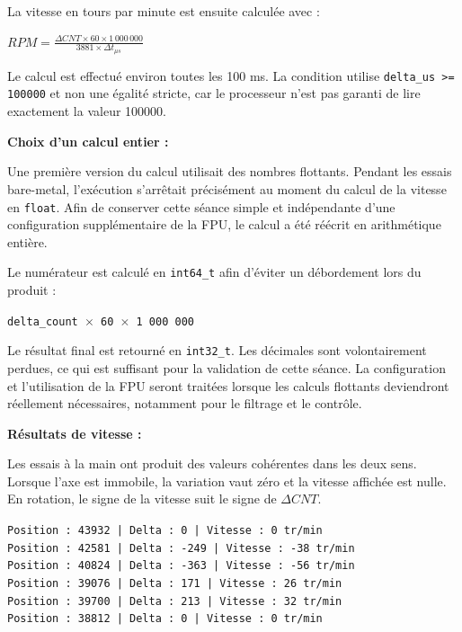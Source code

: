 \documentclass[11pt,a4paper]{article}
\begin{document}
\begin{sessionbox}
		La vitesse en tours par minute est ensuite calculée avec :
		
		\begin{center}
			$RPM = \frac{\Delta CNT \times 60 \times 1\,000\,000}{3881 \times \Delta t_{\mu s}}$
		\end{center}
		
		Le calcul est effectué environ toutes les 100 ms. La condition utilise \texttt{delta\_us >= 100000} et non une égalité stricte, car le processeur n'est pas garanti de lire exactement la valeur 100000.
		
		\vspace{0.3cm}
		
		\textbf{Choix d'un calcul entier :}
		
		Une première version du calcul utilisait des nombres flottants. Pendant les essais bare-metal, l'exécution s'arrêtait précisément au moment du calcul de la vitesse en \texttt{float}. Afin de conserver cette séance simple et indépendante d'une configuration supplémentaire de la FPU, le calcul a été réécrit en arithmétique entière.
		
		Le numérateur est calculé en \texttt{int64\_t} afin d'éviter un débordement lors du produit :
		
		\begin{center}
			\texttt{delta\_count $\times$ 60 $\times$ 1 000 000}
		\end{center}
		
		Le résultat final est retourné en \texttt{int32\_t}. Les décimales sont volontairement perdues, ce qui est suffisant pour la validation de cette séance. La configuration et l'utilisation de la FPU seront traitées lorsque les calculs flottants deviendront réellement nécessaires, notamment pour le filtrage et le contrôle.
		
		\vspace{0.3cm}
		
		\textbf{Résultats de vitesse :}
		
		Les essais à la main ont produit des valeurs cohérentes dans les deux sens. Lorsque l'axe est immobile, la variation vaut zéro et la vitesse affichée est nulle. En rotation, le signe de la vitesse suit le signe de $\Delta CNT$.
		
		\begin{center}
			\texttt{Position : 43932 | Delta : 0 | Vitesse : 0 tr/min}\\
			\texttt{Position : 42581 | Delta : -249 | Vitesse : -38 tr/min}\\
			\texttt{Position : 40824 | Delta : -363 | Vitesse : -56 tr/min}\\
			\texttt{Position : 39076 | Delta : 171 | Vitesse : 26 tr/min}\\
			\texttt{Position : 39700 | Delta : 213 | Vitesse : 32 tr/min}\\
			\texttt{Position : 38812 | Delta : 0 | Vitesse : 0 tr/min}
		\end{center}
		

\end{sessionbox}
\end{document}
